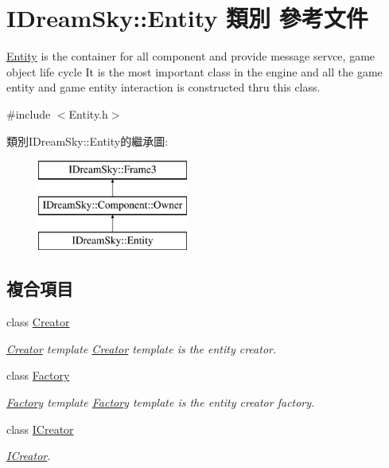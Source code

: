 \hypertarget{class_i_dream_sky_1_1_entity}{}\section{I\+Dream\+Sky\+:\+:Entity 類別 參考文件}
\label{class_i_dream_sky_1_1_entity}


\hyperlink{class_i_dream_sky_1_1_entity}{Entity} is the container for all component and provide message servce, game object life cycle It is the most important class in the engine and all the game entity and game entity interaction is constructed thru this class.  




{\ttfamily \#include $<$Entity.\+h$>$}

類別\+I\+Dream\+Sky\+:\+:Entity的繼承圖\+:\begin{figure}[H]
\begin{center}
\leavevmode
\includegraphics[height=3.000000cm]{class_i_dream_sky_1_1_entity}
\end{center}
\end{figure}
\subsection*{複合項目}
\begin{DoxyCompactItemize}
\item 
class \hyperlink{class_i_dream_sky_1_1_entity_1_1_creator}{Creator}
\begin{DoxyCompactList}\small\item\em \hyperlink{class_i_dream_sky_1_1_entity_1_1_creator}{Creator} template \hyperlink{class_i_dream_sky_1_1_entity_1_1_creator}{Creator} template is the entity creator. \end{DoxyCompactList}\item 
class \hyperlink{class_i_dream_sky_1_1_entity_1_1_factory}{Factory}
\begin{DoxyCompactList}\small\item\em \hyperlink{class_i_dream_sky_1_1_entity_1_1_factory}{Factory} template \hyperlink{class_i_dream_sky_1_1_entity_1_1_factory}{Factory} template is the entity creator factory. \end{DoxyCompactList}\item 
class \hyperlink{class_i_dream_sky_1_1_entity_1_1_i_creator}{I\+Creator}
\begin{DoxyCompactList}\small\item\em \hyperlink{class_i_dream_sky_1_1_entity_1_1_i_creator}{I\+Creator}. \end{DoxyCompactList}\end{DoxyCompactItemize}
